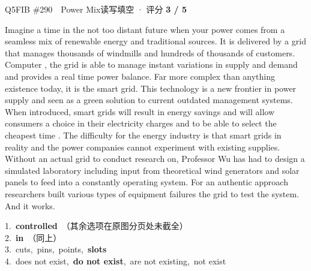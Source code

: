 \begin{qblock}{Q5\quad FIB \#290\ \ Power Mix}{读写填空 · 评分 \textcolor{cAccent}{\bfseries 3 / 5}}
\begin{promptbox}
Imagine a time in the not too distant future when your power comes from a seamless mix of renewable energy and traditional sources. It is delivered by a grid that manages thousands of windmills and hundreds of thousands of customers. Computer , the grid is able to manage instant variations in supply and demand and provides a real time power balance. Far more complex than anything  existence today, it is the smart grid. This technology is a new frontier in power supply and seen as a green solution to current outdated management systems. When introduced, smart grids will result in energy savings and will allow consumers a choice in their electricity charges and to be able to select the cheapest time . The difficulty for the energy industry is that smart grids  in reality and the power companies cannot experiment with existing supplies. Without an actual grid to conduct research on, Professor Wu has had to design a simulated laboratory including input from theoretical wind generators and solar panels to feed into a constantly operating system. For an authentic approach researchers built various types of equipment failures  the grid to test the system. And it works.
\end{promptbox}
{\small
1.\ \textbf{controlled}\ {\footnotesize\color{gray}（其余选项在原图分页处未截全）}\\
2.\ \textbf{in}\ {\footnotesize\color{gray}（同上）}\\
3.\ cuts,\ pins,\ points,\ \textbf{slots}\\
4.\ does not exist,\ \textbf{do not exist},\ are not existing,\ not exist\\
}
\end{qblock}
